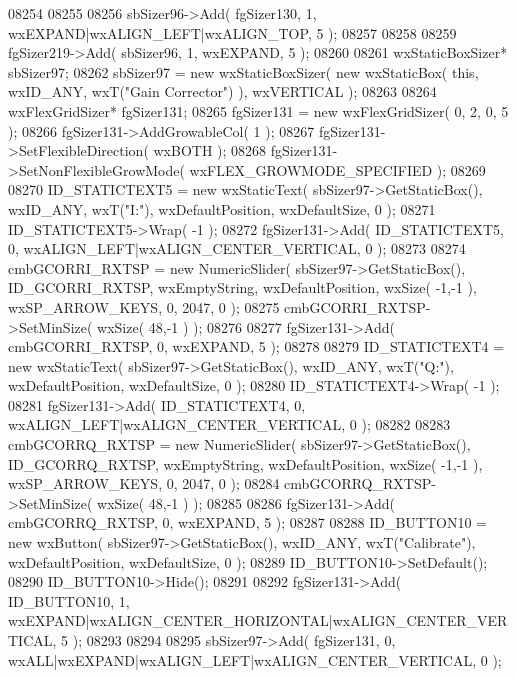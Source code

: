 \begin{DoxyCode}
08254     
08255     
08256     sbSizer96->Add( fgSizer130, 1, wxEXPAND|wxALIGN\_LEFT|wxALIGN\_TOP, 5 );
08257     
08258     
08259     fgSizer219->Add( sbSizer96, 1, wxEXPAND, 5 );
08260     
08261     wxStaticBoxSizer* sbSizer97;
08262     sbSizer97 = \textcolor{keyword}{new} wxStaticBoxSizer( \textcolor{keyword}{new} wxStaticBox( \textcolor{keyword}{this}, wxID\_ANY, wxT(\textcolor{stringliteral}{"Gain Corrector"}) ), wxVERTICAL 
      );
08263     
08264     wxFlexGridSizer* fgSizer131;
08265     fgSizer131 = \textcolor{keyword}{new} wxFlexGridSizer( 0, 2, 0, 5 );
08266     fgSizer131->AddGrowableCol( 1 );
08267     fgSizer131->SetFlexibleDirection( wxBOTH );
08268     fgSizer131->SetNonFlexibleGrowMode( wxFLEX\_GROWMODE\_SPECIFIED );
08269     
08270     ID_STATICTEXT5 = \textcolor{keyword}{new} wxStaticText( sbSizer97->GetStaticBox(), wxID\_ANY, wxT(\textcolor{stringliteral}{"I:"}), wxDefaultPosition, 
      wxDefaultSize, 0 );
08271     ID_STATICTEXT5->Wrap( -1 );
08272     fgSizer131->Add( ID_STATICTEXT5, 0, wxALIGN\_LEFT|wxALIGN\_CENTER\_VERTICAL, 0 );
08273     
08274     cmbGCORRI_RXTSP = \textcolor{keyword}{new} NumericSlider( sbSizer97->GetStaticBox(), 
      ID_GCORRI_RXTSP, wxEmptyString, wxDefaultPosition, wxSize( -1,-1 ), wxSP\_ARROW\_KEYS, 0, 2047, 0 );
08275     cmbGCORRI_RXTSP->SetMinSize( wxSize( 48,-1 ) );
08276     
08277     fgSizer131->Add( cmbGCORRI_RXTSP, 0, wxEXPAND, 5 );
08278     
08279     ID_STATICTEXT4 = \textcolor{keyword}{new} wxStaticText( sbSizer97->GetStaticBox(), wxID\_ANY, wxT(\textcolor{stringliteral}{"Q:"}), wxDefaultPosition, 
      wxDefaultSize, 0 );
08280     ID_STATICTEXT4->Wrap( -1 );
08281     fgSizer131->Add( ID_STATICTEXT4, 0, wxALIGN\_LEFT|wxALIGN\_CENTER\_VERTICAL, 0 );
08282     
08283     cmbGCORRQ_RXTSP = \textcolor{keyword}{new} NumericSlider( sbSizer97->GetStaticBox(), 
      ID_GCORRQ_RXTSP, wxEmptyString, wxDefaultPosition, wxSize( -1,-1 ), wxSP\_ARROW\_KEYS, 0, 2047, 0 );
08284     cmbGCORRQ_RXTSP->SetMinSize( wxSize( 48,-1 ) );
08285     
08286     fgSizer131->Add( cmbGCORRQ_RXTSP, 0, wxEXPAND, 5 );
08287     
08288     ID_BUTTON10 = \textcolor{keyword}{new} wxButton( sbSizer97->GetStaticBox(), wxID\_ANY, wxT(\textcolor{stringliteral}{"Calibrate"}), wxDefaultPosition, 
      wxDefaultSize, 0 );
08289     ID_BUTTON10->SetDefault(); 
08290     ID_BUTTON10->Hide();
08291     
08292     fgSizer131->Add( ID_BUTTON10, 1, wxEXPAND|wxALIGN\_CENTER\_HORIZONTAL|wxALIGN\_CENTER\_VERTICAL, 5 );
08293     
08294     
08295     sbSizer97->Add( fgSizer131, 0, wxALL|wxEXPAND|wxALIGN\_LEFT|wxALIGN\_CENTER\_VERTICAL, 0 );

\end{DoxyCode}
